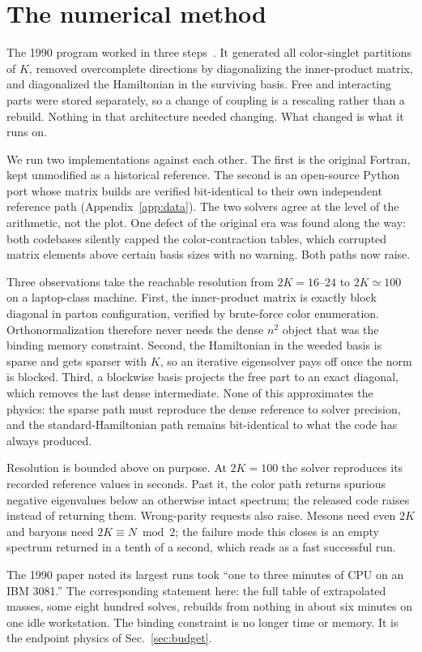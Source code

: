 \section{The numerical method}
\label{sec:method}

The 1990 program worked in three steps~\cite{Hornbostel:1988fb}.  It
generated all color-singlet partitions of $K$, removed overcomplete
directions by diagonalizing the inner-product matrix, and diagonalized the
Hamiltonian in the surviving basis.  Free and interacting parts were stored
separately, so a change of coupling is a rescaling rather than a rebuild.
Nothing in that architecture needed changing.  What changed is what it
runs on.

We run two implementations against each other.  The first is the original
Fortran, kept unmodified as a historical reference.  The second is an
open-source Python port whose matrix builds are verified bit-identical to
their own independent reference path (Appendix~\ref{app:data}).  The two
solvers agree at the level of the arithmetic, not the plot.  One defect of
the original era was found along the way: both codebases silently capped
the color-contraction tables, which corrupted matrix elements above certain
basis sizes with no warning.  Both paths now raise.

Three observations take the reachable resolution from $2K = 16$--$24$ to
$2K \simeq 100$ on a laptop-class machine.  First, the inner-product matrix
is exactly block diagonal in parton configuration, verified by brute-force
color enumeration.  Orthonormalization therefore never needs the dense
$n^2$ object that was the binding memory constraint.  Second, the
Hamiltonian in the weeded basis is sparse and gets sparser with $K$, so an
iterative eigensolver pays off once the norm is blocked.  Third, a
blockwise basis projects the free part to an exact diagonal, which removes
the last dense intermediate.  None of this approximates the physics: the
sparse path must reproduce the dense reference to solver precision, and the
standard-Hamiltonian path remains bit-identical to what the code has always
produced.

Resolution is bounded above on purpose.  At $2K = 100$ the solver
reproduces its recorded reference values in seconds.  Past it, the color
path returns spurious negative eigenvalues below an otherwise intact
spectrum; the released code raises instead of returning them.  Wrong-parity
requests also raise.  Mesons need even $2K$ and baryons need
$2K \equiv N \bmod 2$; the failure mode this closes is an empty spectrum
returned in a tenth of a second, which reads as a fast successful run.

The 1990 paper noted its largest runs took ``one to three minutes of CPU on
an IBM 3081.''  The corresponding statement here: the full table of
extrapolated masses, some eight hundred solves, rebuilds from nothing in
about six minutes on one idle workstation.  The binding constraint is no
longer time or memory.  It is the endpoint physics of Sec.~\ref{sec:budget}.

